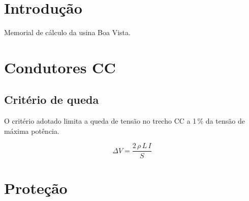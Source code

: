 \documentclass[12pt]{article}
\begin{document}
\section{Introdução}
Memorial de cálculo da usina Boa Vista.

\section{Condutores CC}
\subsection{Critério de queda}
O critério adotado limita a queda de tensão no
trecho CC a 1\,\% da tensão de máxima potência.

\begin{equation}
  \Delta V = \frac{2\,\rho\,L\,I}{S}
\end{equation}

\section{Proteção}
\end{document}
